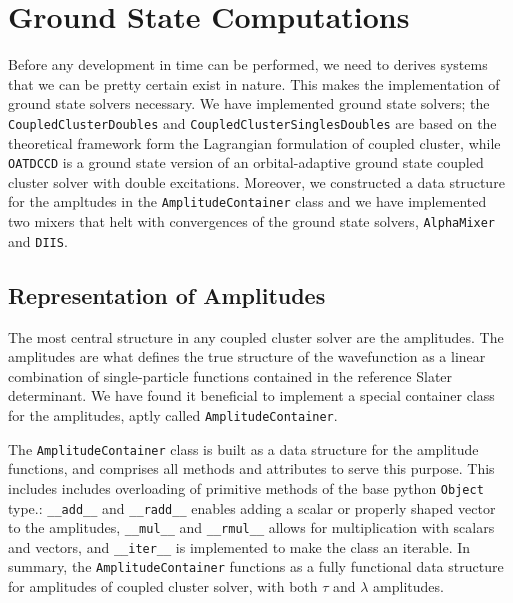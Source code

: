 \section{Ground State Computations}

    Before any development in time can be performed, we need to derives systems that 
    we can be pretty certain exist in nature. This makes the implementation of ground 
    state solvers necessary. We have implemented ground state solvers; the
    \lstinline{CoupledClusterDoubles} and \lstinline{CoupledClusterSinglesDoubles} 
    are based on the theoretical framework form the Lagrangian formulation of coupled 
    cluster, while \lstinline{OATDCCD} is a ground state version of an orbital-adaptive 
    ground state coupled cluster solver with double excitations. Moreover, we constructed 
    a data structure for the ampltudes in the \lstinline{AmplitudeContainer} class and 
    we have implemented two mixers that helt with convergences of the ground state solvers,
    \lstinline{AlphaMixer} and \lstinline{DIIS}.

    \subsection{Representation of Amplitudes}

    The most central structure in any coupled cluster solver are the amplitudes. The 
    amplitudes are what defines the true structure of the wavefunction as a linear 
    combination of single-particle functions contained in the reference Slater 
    determinant. We have found it beneficial to implement a special container 
    class for the amplitudes, aptly called \lstinline{AmplitudeContainer}.

    

    The \lstinline{AmplitudeContainer} class is built as a data structure for 
    the amplitude functions, and comprises all methods and attributes to serve this 
    purpose. This includes includes overloading of primitive methods of the base 
    python \lstinline{Object} type.: \lstinline{__add__} and \lstinline{__radd__}
    enables adding a scalar or properly shaped vector to the amplitudes, 
    \lstinline{__mul__} and \lstinline{__rmul__} allows for multiplication 
    with scalars and vectors, and \lstinline{__iter__} is implemented to make 
    the class an iterable. In summary, the \lstinline{AmplitudeContainer} 
    functions as a fully functional data structure for amplitudes of coupled 
    cluster solver, with both $\tau$ and $\lambda$ amplitudes.

